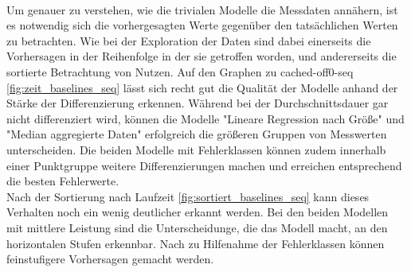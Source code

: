 \documentclass[
	12pt,
	a4paper,
	BCOR10mm,
	DIV14,
	listof=totoc,
	bibliography=totoc,
	headsepline
]{scrreprt}
\begin{document}
\\
Um genauer zu verstehen, wie die trivialen Modelle die Messdaten annähern, ist es notwendig sich die vorhergesagten Werte gegenüber den tatsächlichen Werten zu betrachten. Wie bei der Exploration der Daten sind dabei einerseits die Vorhersagen in der Reihenfolge in der sie getroffen worden, und andererseits die sortierte Betrachtung von Nutzen.  
Auf den Graphen zu cached-off0-seq \ref{fig:zeit_baselines_seq} lässt sich recht gut die Qualität der Modelle anhand der Stärke der Differenzierung erkennen. Während bei der Durchschnittsdauer gar nicht differenziert wird, können die Modelle "Lineare Regression nach Größe" und "Median aggregierte Daten" erfolgreich die größeren Gruppen von Messwerten unterscheiden. 
Die beiden Modelle mit Fehlerklassen können zudem innerhalb einer Punktgruppe weitere Differenzierungen machen und erreichen entsprechend die besten Fehlerwerte.\\
Nach der Sortierung nach Laufzeit \ref{fig:sortiert_baselines_seq} kann dieses Verhalten noch ein wenig deutlicher erkannt werden. Bei den beiden Modellen mit mittlere Leistung sind die Unterscheidunge, die das Modell macht, an den horizontalen Stufen erkennbar. Nach zu Hilfenahme der Fehlerklassen können feinstufigere Vorhersagen gemacht werden.
\end{document}
